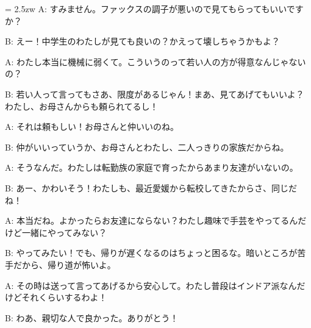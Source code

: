 \documentclass[11pt]{amsart}
\title{}
\author{}
\newenvironment{hangall}[1]{\hangindent = 2.5zw\everypar{\hangindent = 2.5zw}}{}
\begin{document}
\maketitle
\begin{hangall}{}%
A: すみません。ファックスの調子が悪いので見てもらってもいいですか？

B: えー！中学生のわたしが見ても良いの？かえって壊しちゃうかもよ？

A: わたし本当に機械に弱くて。こういうのって若い人の方が得意なんじゃないの？

B: 若い人って言ってもさあ、限度があるじゃん！まあ、見てあげてもいいよ？わたし、お母さんからも頼られてるし！

A: それは頼もしい！お母さんと仲いいのね。

B: 仲がいいっていうか、お母さんとわたし、二人っきりの家族だからね。

A: そうなんだ。わたしは転勤族の家庭で育ったからあまり友達がいないの。

B: あー、かわいそう！わたしも、最近愛媛から転校してきたからさ、同じだね！

A: 本当だね。よかったらお友達にならない？わたし趣味で手芸をやってるんだけど一緒にやってみない？

B: やってみたい！でも、帰りが遅くなるのはちょっと困るな。暗いところが苦手だから、帰り道が怖いよ。

A: その時は送って言ってあげるから安心して。わたし普段はインドア派なんだけどそれくらいするわよ！

B: わあ、親切な人で良かった。ありがとう！
\end{hangall}
\end{document}
